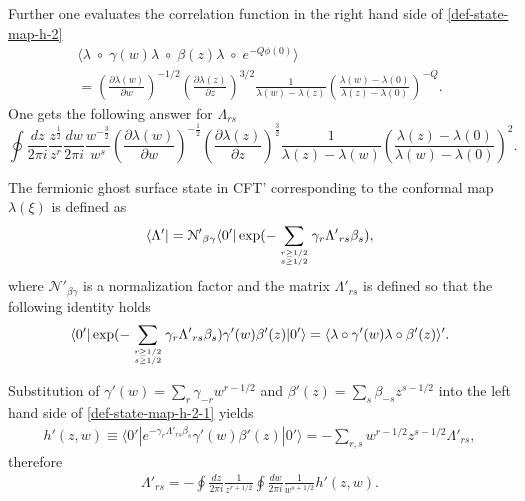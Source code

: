 \documentclass[a4paper,12pt]{article}
\newcommand{\pd}{\partial}
\begin{document}
Further one evaluates the correlation function in the right hand side of
\eqref{def-state-map-h-2}
\begin{multline}
\langle \lambda\;\circ\; \gamma(w)\lambda\;\circ\; \beta(z)\lambda\;\circ\; e^{-Q\phi(0)}\rangle\\
=\left(\frac{\pd\lambda(w)}{\pd w}\right)^{-1/2}
\left(\frac{\pd\lambda(z)}{\pd z}\right)^{3/2}
\frac{1}{\lambda(w)-\lambda(z)}\left(\frac{\lambda(w)-\lambda(0)}{\lambda(z)-\lambda(0)}\right)^{-Q}.
\end{multline}
One gets the following answer for $\Lambda_{rs}$
\begin{equation}
\oint\frac{dz}{2\pi i}\frac{z^{\frac12}}{z^{r}}
\frac{dw}{2\pi i}\frac{w^{-\frac32}}{w^{s}}
\left(\frac{\pd\lambda(w)}{\pd w}\right)^{-\frac12}\!\!\!
\left(\frac{\pd\lambda(z)}{\pd z}\right)^{\frac32}\!\!
\frac{1}{\lambda(z)-\lambda(w)}
\left(\frac{\lambda(z)-\lambda(0)}{\lambda(w)-\lambda(0)}\right)^2.
\label{lambda-conf-sliver0}
\end{equation}


The fermionic ghost surface state in CFT'
corresponding to the conformal map $\lambda(\xi)$ is defined as
\begin{gather}
\langle\Lambda'|=\mathcal{N}'{}_{\beta\gamma} \langle 0'|\exp(-\sum_{r\geq 1/2\atop s\geq 1/2}\gamma_{r}\Lambda'{}_{rs}\beta_{s}),
\end{gather}
where $\mathcal{N}'{}_{\beta\gamma}$ is a normalization factor and
the matrix $\Lambda'{}_{rs}$ is defined so that
the following identity holds
\begin{gather}
\langle 0'|\exp(-\sum_{r\geq 1/2 \atop s\geq
1/2}\gamma_{r}\Lambda'{}_{rs}\beta_{s})\gamma'(w)
\beta'(z)|0'\rangle=
\langle \lambda\circ \gamma'(w)\lambda\circ
\beta'(z)\rangle'.
\label{def-state-map-h-2-1}
\end{gather}

Substitution of
$\gamma'(w)=\sum_{r}\gamma_{-r}w^{r-1/2}$ and
$\beta'(z)=\sum_{s}\beta_{-s}z^{s-1/2}$ into the left hand side of \eqref{def-state-map-h-2-1}
 yields
\begin{gather}
h'(z,w)\equiv\langle 0'|e^{-\gamma_{r}\Lambda'{}_{rs}\beta_{s}}\gamma'(w)
\beta'(z)|0'\rangle=-\sum_{r,s}w^{r-1/2}z^{s-1/2}\Lambda'{}_{rs},
\label{hminusone-1}
\end{gather}
therefore
\begin{gather}
\Lambda'{}_{rs}=-\oint\frac{dz}{2\pi i}\frac{1}{z^{r+1/2}}
\oint\frac{dw}{2\pi i}\frac{1}{w^{s+1/2}}h'(z,w).
\end{gather}
\end{document}
